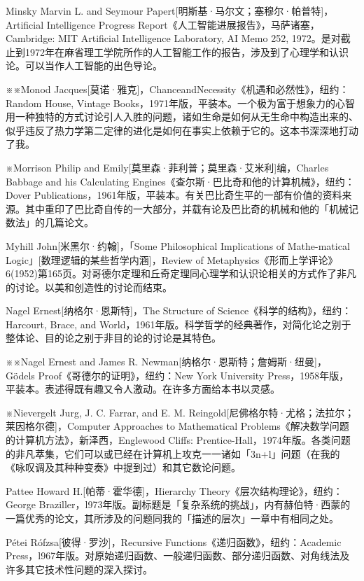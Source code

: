 \documentclass[
  12pt,
  twoside,
  openright,
  oldfontcommands,
]{memoir}
\begin{document}
Minsky Marvin L. and Seymour
Papert{[}明斯基·马尔文；塞穆尔·帕普特{]}，Artificial Intelligence
Progress Report《人工智能进展报告》，马萨诸塞，Cambridge: MIT Artificial
Intelligence Laboratory, AI Memo 252,
1972。是对截止到1972年在麻省理工学院所作的人工智能工作的报告，涉及到了心理学和认识论。可以当作人工智能的出色导论。

※※Monod
Jacques{[}莫诺·雅克{]}，ChanceandNecessity《机遇和必然性》，纽约：Random
House, Vintage
Books，1971年版，平装本。一个极为富于想象力的心智用一种独特的方式讨论引人入胜的问题，诸如生命是如何从无生命中构造出来的、似乎违反了热力学第二定律的进化是如何在事实上依赖于它的。这本书深深地打动了我。

※Morrison Philip and Emily{[}莫里森·菲利普；莫里森·艾米利{]}编，Charles
Babbage and his Calculating
Engines《查尔斯·巴比奇和他的计算机械》，纽约：Dover
Publications，1961年版，平装本。有关巴比奇生平的一部有价值的资料来源。其中重印了巴比奇自传的一大部分，并载有论及巴比奇的机械和他的「机械记数法」的几篇论文。

Myhill John{[}米黑尔·约翰{]}，「Some Philosophical Implications of
Mathe-matical Logic」{[}数理逻辑的某些哲学内涵{]}，Review of
Metaphysics《形而上学评论》6(1952)第165页。对哥德尔定理和丘奇定理同心理学和认识论相关的方式作了非凡的讨论。以美和创造性的讨论而结束。

Nagel Ernest{[}纳格尔·恩斯特{]}，The Structure of
Science《科学的结构》，纽约：Harcourt, Brace, and
World，1961年版。科学哲学的经典著作，对简化论之别于整体论、目的论之别于非目的论的讨论是其特色。

※※Nagel Ernest and James R. Newman{[}纳格尔·恩斯特；詹姆斯·纽曼{]}，
Gödel\textquotesingle s Proof《哥德尔的证明》，纽约：New York University
Press，1958年版，平装本。表述得既有趣又令人激动。在许多方面给本书以灵感。

※Nievergelt Jurg, J. C. Farrar, and E. M.
Reingold{[}尼佛格尔特·尤格；法拉尔；莱因格尔德{]}，Computer Approaches
to Mathematical Problems《解决数学问题的计算机方法》，新泽西，Englewood
Cliffs:
Prentice-Hall，1974年版。各类问题的非凡萃集，它们可以或已经在计算机上攻克一一诸如「3n+l」问题（在我的《咏叹调及其种种变奏》中提到过）和其它数论问题。

Pattee Howard H.{[}帕蒂·霍华德{]}，Hierarchy
Theory《层次结构理论》，纽约：George
Braziller，l973年版。副标题是「复杂系统的挑战」，内有赫伯特·西蒙的一篇优秀的论文，其所涉及的问题同我的「描述的层次」一章中有相同之处。

Pétei Rófzsa{[}彼得·罗沙{]}，Recursive
Functions《递归函数》，纽约：Academic
Press，l967年版。对原始递归函数、一般递归函数、部分递归函数、对角线法及许多其它技术性问题的深入探讨。
\end{document}
